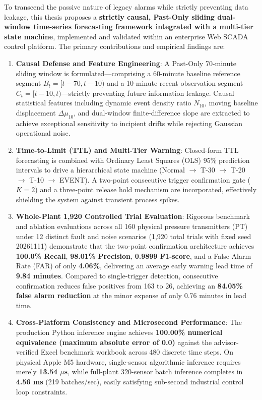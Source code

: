\documentclass[fontset=none, a4paper, 12pt]{ctexart}
\begin{document}
{To transcend the passive nature of legacy alarms while strictly preventing data leakage, this thesis proposes a \textbf{strictly causal, Past-Only sliding dual-window time-series forecasting framework integrated with a multi-tier state machine}, implemented and validated within an enterprise Web SCADA control platform. The primary contributions and empirical findings are:
\begin{enumerate}
    \item \textbf{Causal Defense and Feature Engineering}: A Past-Only 70-minute sliding window is formulated—comprising a 60-minute baseline reference segment $B_t=[t-70, t-10)$ and a 10-minute recent observation segment $C_t=[t-10, t)$—strictly preventing future information leakage. Causal statistical features including dynamic event density ratio $N_{10}$, moving baseline displacement $\Delta\mu_{10}$, and dual-window finite-difference slope are extracted to achieve exceptional sensitivity to incipient drifts while rejecting Gaussian operational noise.
    \item \textbf{Time-to-Limit (TTL) and Multi-Tier Warning}: Closed-form TTL forecasting is combined with Ordinary Least Squares (OLS) 95\% prediction intervals to drive a hierarchical state machine (Normal $\to$ T-30 $\to$ T-20 $\to$ T-10 $\to$ EVENT). A two-point consecutive trigger confirmation gate ($K=2$) and a three-point release hold mechanism are incorporated, effectively shielding the system against transient process spikes.
    \item \textbf{Whole-Plant 1,920 Controlled Trial Evaluation}: Rigorous benchmark and ablation evaluations across all 160 physical pressure transmitters (PT) under 12 distinct fault and noise scenarios (1,920 total trials with fixed seed 20261111) demonstrate that the two-point confirmation architecture achieves \textbf{100.0\% Recall}, \textbf{98.01\% Precision}, \textbf{0.9899 F1-score}, and a False Alarm Rate (FAR) of only \textbf{4.06\%}, delivering an average early warning lead time of \textbf{9.84 minutes}. Compared to single-trigger detection, consecutive confirmation reduces false positives from 163 to 26, achieving an \textbf{84.05\% false alarm reduction} at the minor expense of only 0.76 minutes in lead time.
    \item \textbf{Cross-Platform Consistency and Microsecond Performance}: The production Python inference engine achieves \textbf{100.00\% numerical equivalence (maximum absolute error of 0.0)} against the advisor-verified Excel benchmark workbook across 480 discrete time steps. On physical Apple M5 hardware, single-sensor algorithmic inference requires merely \textbf{13.54 $\mu$s}, while full-plant 320-sensor batch inference completes in \textbf{4.56 ms} (219 batches/sec), easily satisfying sub-second industrial control loop constraints.

\end{enumerate}}
\end{document}
